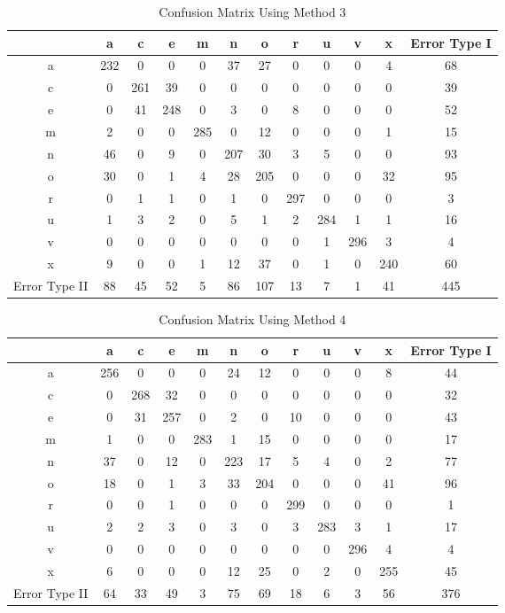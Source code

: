 \documentclass[12pt]{article}
\begin{document}
\begin{table}[!ht]
    \centering
    \caption{Confusion Matrix Using Method 3}
    \begin{tabular}{| c | c | c | c | c | c | c | c | c | c | c | c |} \hline
        & a & c & e & m & n & o & r & u & v & x & Error Type I\\ \hline
      a & 232 & 0 & 0 & 0 & 37 & 27 & 0 & 0 & 0 & 4 & 68\\ \hline
      c & 0 & 261 & 39 & 0 & 0 & 0 & 0 & 0 & 0 & 0 & 39\\ \hline
      e & 0 & 41 & 248 & 0 & 3 & 0 & 8 & 0 & 0 & 0 & 52\\ \hline
      m & 2 & 0 & 0 & 285 & 0 & 12 & 0 & 0 & 0 & 1 & 15\\ \hline
      n & 46 & 0 & 9 & 0 & 207 & 30 & 3 & 5 & 0 & 0 & 93\\ \hline
      o & 30 & 0 & 1 & 4 & 28 & 205 & 0 & 0 & 0 & 32 & 95\\ \hline
      r & 0 & 1 & 1 & 0 & 1 & 0 & 297 & 0 & 0 & 0 & 3\\ \hline
      u & 1 & 3 & 2 & 0 & 5 & 1 & 2 & 284 & 1 & 1 & 16\\ \hline
      v & 0 & 0 & 0 & 0 & 0 & 0 & 0 & 1 & 296 & 3 & 4\\ \hline
      x & 9 & 0 & 0 & 1 & 12 & 37 & 0 & 1 & 0 & 240 & 60\\ \hline
Error Type II & 88 & 45 & 52 & 5 & 86 & 107 & 13 & 7 & 1 & 41 & 445\\ \hline
    \end{tabular}
\end{table}

\begin{table}[!ht]
    \centering
    \caption{Confusion Matrix Using Method 4}
    \begin{tabular}{| c | c | c | c | c | c | c | c | c | c | c | c |} \hline
        & a & c & e & m & n & o & r & u & v & x & Error Type I\\ \hline
      a & 256 & 0 & 0 & 0 & 24 & 12 & 0 & 0 & 0 & 8 & 44\\ \hline
      c & 0 & 268 & 32 & 0 & 0 & 0 & 0 & 0 & 0 & 0 & 32\\ \hline
      e & 0 & 31 & 257 & 0 & 2 & 0 & 10 & 0 & 0 & 0 & 43\\ \hline
      m & 1 & 0 & 0 & 283 & 1 & 15 & 0 & 0 & 0 & 0 & 17\\ \hline
      n & 37 & 0 & 12 & 0 & 223 & 17 & 5 & 4 & 0 & 2 & 77\\ \hline
      o & 18 & 0 & 1 & 3 & 33 & 204 & 0 & 0 & 0 & 41 & 96\\ \hline
      r & 0 & 0 & 1 & 0 & 0 & 0 & 299 & 0 & 0 & 0 & 1\\ \hline
      u & 2 & 2 & 3 & 0 & 3 & 0 & 3 & 283 & 3 & 1 & 17\\ \hline
      v & 0 & 0 & 0 & 0 & 0 & 0 & 0 & 0 & 296 & 4 & 4\\ \hline
      x & 6 & 0 & 0 & 0 & 12 & 25 & 0 & 2 & 0 & 255 & 45\\ \hline
Error Type II & 64 & 33 & 49 & 3 & 75 & 69 & 18 & 6 & 3 & 56 & 376\\ \hline
    \end{tabular}
\end{table}
\end{document}
